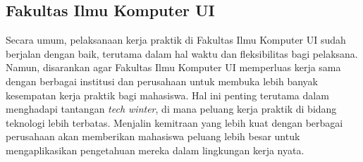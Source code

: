 \subsection{Fakultas Ilmu Komputer UI}

Secara umum, pelaksanaan kerja praktik di Fakultas Ilmu Komputer UI sudah berjalan dengan baik, terutama dalam hal waktu dan fleksibilitas bagi pelaksana. Namun, disarankan agar Fakultas Ilmu Komputer UI memperluas kerja sama dengan berbagai institusi dan perusahaan untuk membuka lebih banyak kesempatan kerja praktik bagi mahasiswa. Hal ini penting terutama dalam menghadapi tantangan \textit{tech winter}, di mana peluang kerja praktik di bidang teknologi lebih terbatas. Menjalin kemitraan yang lebih kuat dengan berbagai perusahaan akan memberikan mahasiswa peluang lebih besar untuk mengaplikasikan pengetahuan mereka dalam lingkungan kerja nyata.
